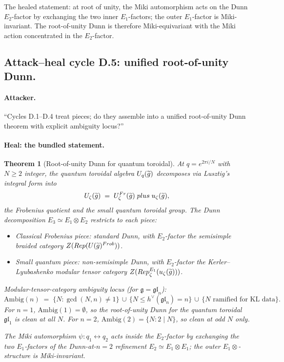 \documentclass[11pt]{article}
\newtheorem{theorem}{Theorem}[section]
\newcommand{\Eone}{E_{1}}
\newcommand{\Etwo}{E_{2}}
\newcommand{\Ethree}{E_{3}}
\newcommand{\cU}{\mathcal{U}}
\newcommand{\cZ}{\mathcal{Z}}
\newcommand{\Rep}{\mathrm{Rep}}
\newcommand{\frakg}{\mathfrak{g}}
\newcommand{\fgl}{\mathfrak{gl}}
\begin{document}
The healed statement: at root of unity, the Miki automorphism acts on
the Dunn $\Etwo$-factor by exchanging the two inner $\Eone$-factors;
the outer $\Eone$-factor is Miki-invariant. The root-of-unity Dunn is
therefore Miki-equivariant with the Miki action concentrated in the
$\Etwo$-factor.

\subsection{Attack--heal cycle D.5: unified root-of-unity Dunn.}

\paragraph{Attacker.}
``Cycles D.1--D.4 treat pieces; do they assemble into a unified
root-of-unity Dunn theorem with explicit ambiguity locus?''

\paragraph{Heal: the bundled statement.}
\begin{theorem}[Root-of-unity Dunn for quantum toroidal]
  \label{thm:root-of-unity-dunn}
  At $q = e^{2\pi i/N}$ with $N \geq 2$ integer, the quantum toroidal
  algebra $\cU_q(\widetilde{\widehat\frakg})$ decomposes via
  Lusztig's integral form into
  \[
    \cU_\zeta(\widetilde{\widehat\frakg}) \;=\;
    \cU_\zeta^{\mathrm{Fr}}(\widetilde{\widehat\frakg}) \;\oplus\;
    u_\zeta(\widetilde{\widehat\frakg}),
  \]
  the Frobenius quotient and the small quantum toroidal group. The
  Dunn decomposition $\Ethree \simeq \Eone \otimes \Etwo$ restricts
  to each piece:
  \begin{itemize}
  \item Classical Frobenius piece: standard Dunn, with $\Etwo$-factor
    the semisimple braided category
    $\cZ(\Rep(\cU(\widetilde{\widehat\frakg})^{\mathrm{Frob}}))$.
  \item Small quantum piece: non-semisimple Dunn, with $\Etwo$-factor
    the Kerler--Lyubashenko modular tensor category
    $\cZ(\Rep_\zeta^{\Eone}(u_\zeta(\widetilde{\widehat\frakg})))$.
  \end{itemize}
  Modular-tensor-category ambiguity locus (for $\frakg = \fgl_n$):
  \[
    \mathrm{Ambig}(n) \;=\;
    \bigl\{N : \gcd(N, n) \neq 1\bigr\}
    \,\cup\,
    \bigl\{N \leq h^\vee(\fgl_n) = n\bigr\}
    \,\cup\,
    \bigl\{N \text{ ramified for KL data}\bigr\}.
  \]
  For $n = 1$, $\mathrm{Ambig}(1) = \emptyset$, so the root-of-unity
  Dunn for the quantum toroidal $\fgl_1$ is clean at all $N$.
  For $n = 2$, $\mathrm{Ambig}(2) = \{N : 2 \mid N\}$, so clean at odd
  $N$ only.

  The Miki automorphism $\psi : q_1 \leftrightarrow q_2$ acts inside
  the $\Etwo$-factor by exchanging the two $\Eone$-factors of the
  Dunn-at-$n=2$ refinement $\Etwo \simeq \Eone \otimes \Eone$; the
  outer $\Eone \otimes$-structure is Miki-invariant.
\end{theorem}
\end{document}
